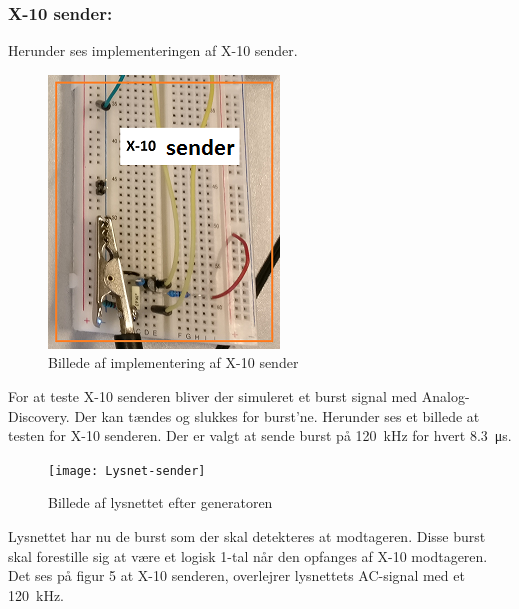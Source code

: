 \documentclass[11pt]{article}
\begin{document}
\subsubsection{X-10 sender:}
Herunder ses implementeringen af X-10 sender.
\begin{figure}[H]
\centering
\includegraphics[scale = 1]{X-10sender}
\caption{Billede af implementering af X-10 sender}
\end{figure}
For at teste X-10 senderen bliver der simuleret et burst signal med Analog-Discovery. Der kan tændes og slukkes for burst'ne. Herunder ses et billede at testen for X-10 senderen. Der er valgt at sende burst på \SI{120}{\kilo\hertz} for hvert \SI{8.3}{\micro\second}.
\begin{figure}[H]
\centering
\texttt{[image: Lysnet-sender]}
\caption{Billede af lysnettet efter generatoren}
\end{figure}
Lysnettet har nu de burst som der skal detekteres at modtageren. Disse burst skal forestille sig at være et logisk 1-tal når den opfanges af X-10 modtageren. Det ses på figur 5 at X-10 senderen, overlejrer lysnettets AC-signal med et \SI{120}{\kilo\hertz}.
\end{document}
